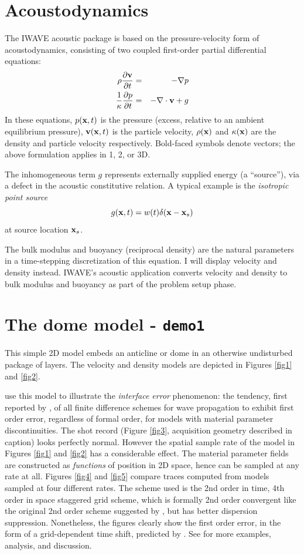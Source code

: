 \documentclass [12pt]{georeport}
\newcommand{\bx}{{\bf x}}
\newcommand{\bv}{{\bf v}}
\begin{document}
\section{Acoustodynamics}
The IWAVE acoustic package is based on the pressure-velocity form of acoustodynamics, consisting of two coupled first-order partial differential equations:
\begin{eqnarray}
\label{awe}
\rho \frac{\partial \bv}{\partial t} &=& - \nabla p \\
\frac{1}{\kappa}\frac{\partial p}{\partial t} &=& -\nabla \cdot \bv + g
\end{eqnarray}
In these equations, $p(\bx,t)$ is the pressure (excess, relative to an ambient equilibrium pressure), $\bv(\bx,t)$ is the particle velocity, $\rho(\bx)$ and $\kappa(\bx)$ are the density and particle velocity respectively. Bold-faced symbols denote vectors; the above formulation applies in 1, 2, or 3D. 

The inhomogeneous term $g$ represents externally supplied energy (a
``source''), via a defect in the acoustic constitutive relation. A
typical example is the {\em isotropic point source}
\[
g(\bx,t) = w(t) \delta(\bx-\bx_s)
\]
at source location $\bx_s$.

The bulk modulus and buoyancy (reciprocal density) are the natural parameters in a time-stepping discretization of this equation. I will display velocity and density instead. IWAVE's acoustic application converts velocity and density to bulk modulus and buoyancy as part of the problem setup phase.

\section{The dome model - {\tt demo1}}

This simple 2D model embeds an anticline or dome in an otherwise
undisturbed package of layers. The velocity and density models are
depicted in Figures \ref{fig1} and \ref{fig2}.

\cite[]{SymesVdovina:09} use this model to illustrate the {\em
  interface error} phenomenon: the tendency, first reported by
\cite[]{Brown:84}, of all finite difference schemes for wave
propagation to exhibit first order error, regardless of formal order,
for models with material parameter discontinuities. The shot record
(Figure \ref{fig3}, acquisition geometry described in caption) looks
perfectly normal. However the spatial sample rate of the model in
Figures \ref{fig1} and \ref{fig2} has a considerable effect. The
material parameter fields are constructed as {\em functions} of
position in 2D space, hence can be sampled at any rate at all. Figures
\ref{fig4} and \ref{fig5} compare traces computed from models sampled
at four different rates. The scheme used is the 2nd order in time,
4th order in space staggered grid scheme, which is formally 2nd order
convergent like the original 2nd order scheme suggested by
\cite[]{Vir:84}, but has better dispersion suppression. Nonetheless,
the figures clearly show the first order error, in the form of a
grid-dependent time shift, predicted by \cite[]{Brown:84}. See
\cite{SymesVdovina:09} for more examples, analysis, and discussion.
\end{document}
